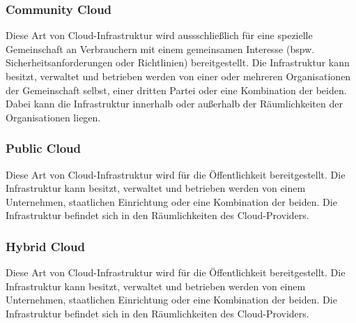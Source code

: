 \subsubsection{Community Cloud}
Diese Art von Cloud-Infrastruktur wird aussschließlich für eine spezielle Gemeinschaft an Verbrauchern mit einem gemeinsamen Interesse (bspw. Sicherheitsanforderungen oder Richtlinien) bereitgestellt. Die Infrastruktur kann besitzt, verwaltet und betrieben werden von einer oder mehreren Organisationen der Gemeinschaft selbst, einer dritten Partei oder eine Kombination der beiden. Dabei kann die Infrastruktur innerhalb oder außerhalb der Räumlichkeiten der Organisationen liegen.

\subsubsection{Public Cloud}
Diese Art von Cloud-Infrastruktur wird für die Öffentlichkeit bereitgestellt. Die Infrastruktur kann besitzt, verwaltet und betrieben werden von einem Unternehmen, staatlichen Einrichtung oder eine Kombination der beiden. Die Infrastruktur befindet sich in den Räumlichkeiten des Cloud-Providers.

\subsubsection{Hybrid Cloud}
Diese Art von Cloud-Infrastruktur wird für die Öffentlichkeit bereitgestellt. Die Infrastruktur kann besitzt, verwaltet und betrieben werden von einem Unternehmen, staatlichen Einrichtung oder eine Kombination der beiden. Die Infrastruktur befindet sich in den Räumlichkeiten des Cloud-Providers.


